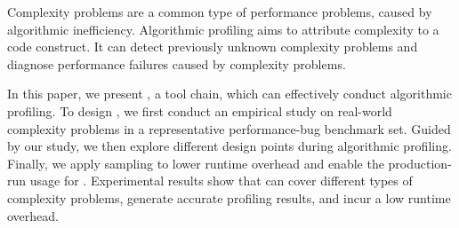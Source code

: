 Complexity problems are a common type of performance problems, 
caused by algorithmic inefficiency. 
Algorithmic profiling aims to attribute complexity to a code construct.
It can detect previously unknown complexity problems and diagnose performance failures 
caused by complexity problems. 

In this paper, we present \Tool, a tool chain, 
which can effectively conduct algorithmic profiling. 
To design \Tool, we first conduct an empirical study on 
real-world complexity problems in a representative performance-bug benchmark set. 
Guided by our study, 
we then explore different design points during algorithmic profiling.
Finally, we apply sampling to lower runtime overhead and enable the production-run usage for \Tool.
Experimental results show that \Tool can cover different types of complexity problems, 
generate accurate profiling results, and incur a low runtime overhead. 
